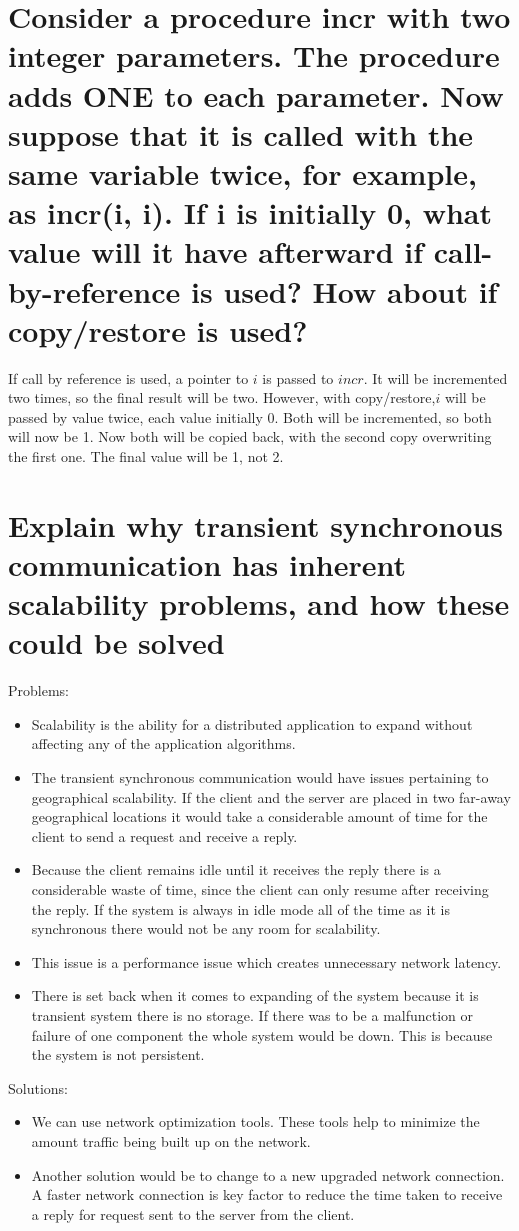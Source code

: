 \documentclass[11pt,a4paper]{report}
\begin{document}
  	\section{Consider a procedure incr with two integer parameters. The procedure adds ONE to each parameter. Now suppose that it is called with the same variable twice, for example, as incr(i, i). If i is initially 0, what value will it have afterward if call-by-reference is used? How about if copy/restore is used?}
  	If call by reference is used, a pointer to $ i $ is passed to $incr$. It will be incremented two times, so the final result will be two. However, with copy/restore,$ i $ will be passed by value twice, each value initially 0. Both will be incremented, so both will now be 1. Now both will be copied back, with the second copy overwriting the first one. The final value will be 1, not 2.
  	
  	\section{Explain why transient synchronous communication has inherent scalability problems, and how these could be solved}
  	Problems:
  	\begin{itemize}
  		\item Scalability is the ability for a distributed application to expand without affecting any of the application algorithms.
  		\item The transient synchronous communication would have issues pertaining to geographical scalability. If the client and the server are placed in two far-away geographical locations it would take a considerable amount of time for the client to send a request and receive a reply.
  		\item Because the client remains idle until it receives the reply there is a considerable waste of time, since the client can only resume after receiving the reply. If the system is always in idle mode all of the time as it is synchronous there would not be any room for scalability.
  		\item This issue is a performance issue which creates unnecessary network latency.
  		\item There is set back when it comes to expanding of the system because it is transient system there is no storage. If there was to be a malfunction or failure of one component the whole system would be down. This is because the system is not persistent.
  	\end{itemize}
	Solutions:
	\begin{itemize}
		\item We can use network optimization tools. These tools help to minimize the amount traffic being built up on the network.
		\item Another solution would be to change to a new upgraded network connection. A faster network connection is key factor to reduce the time taken to receive a reply for request sent to the server from the client.
	\end{itemize}
\end{document}
